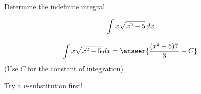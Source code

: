 \documentclass{ximera}
\author{Jason Miller}
\begin{document}
\begin{exercise}
Determine the indefinite integral 

\[
\int x\sqrt{x^{2}-5} \mathop{}\!d x
\]


\[
\int x \sqrt{x^{2}-5} \d x= \answer{ \frac{ (x^{2}-5)^{\frac{3}{2}}}{3} +C }
\]
(Use $C$ for the constant of integration)

\begin{hint}
Try a $u$-substitution first!
\end{hint}
\end{exercise}
\end{document}
